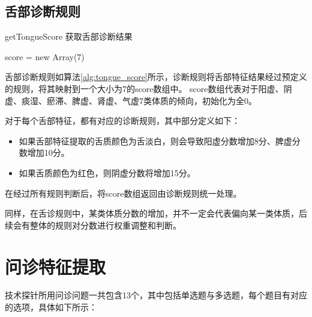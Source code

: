 \subsection{舌部诊断规则}

\begin{algorithm}[htbp]
    \caption{getTongueScore 获取舌部诊断结果\cite{张红凯2018基于舌}}%
    \label{alg:tongue_score}
    \LinesNumbered %
    score = new Array(7) \\

\end{algorithm}

舌部诊断规则如算法\ref{alg:tongue_score}所示，诊断规则将舌部特征结果经过预定义的规则，将其映射到一个大小为7的score数组中。
score数组代表对于阳虚、阴虚、痰湿、瘀滞、脾虚、肾虚、气虚7类体质的倾向，初始化为全0。

对于每个舌部特征，都有对应的诊断规则，其中部分定义如下：
\begin{itemize}
    \item 如果舌部特征提取的舌质颜色为舌淡白，则会导致阳虚分数增加8分、脾虚分数增加10分。
    \item 如果舌质颜色为红色，则阴虚分数将增加15分。
\end{itemize}

在经过所有规则判断后，将score数组返回由诊断规则统一处理。

同样，在舌诊规则中，某类体质分数的增加，并不一定会代表偏向某一类体质，后续会有整体的规则对分数进行权重调整和判断。

\section{问诊特征提取}
\label{subsec:问诊特征提取}
技术探针所用问诊问题一共包含13个，其中包括单选题与多选题，每个题目有对应的选项，具体如下所示：

